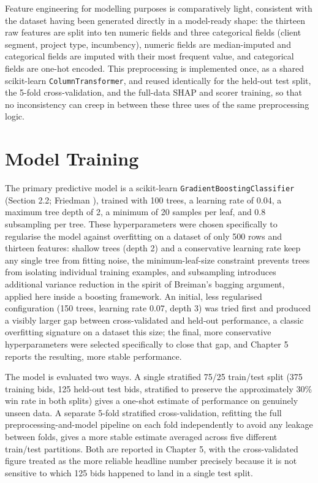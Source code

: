 Feature engineering for modelling purposes is comparatively light,
consistent with the dataset having been generated directly in a
model-ready shape: the thirteen raw features are split into ten numeric
fields and three categorical fields (client segment, project type,
incumbency), numeric fields are median-imputed and categorical fields
are imputed with their most frequent value, and categorical fields are
one-hot encoded. This preprocessing is implemented once, as a shared
scikit-learn \texttt{ColumnTransformer}, and reused identically for the
held-out test split, the 5-fold cross-validation, and the full-data SHAP
and scorer training, so that no inconsistency can creep in between these
three uses of the same preprocessing logic.

\hypertarget{model-training}{%
\section{Model Training}\label{model-training}}

The primary predictive model is a scikit-learn
\texttt{GradientBoostingClassifier} (Section 2.2; Friedman
\citeyearpar{friedman2001greedy}), trained with 100 trees, a learning
rate of 0.04, a maximum tree depth of 2, a minimum of 20 samples per
leaf, and 0.8 subsampling per tree. These hyperparameters were chosen
specifically to regularise the model against overfitting on a dataset of
only 500 rows and thirteen features: shallow trees (depth 2) and a
conservative learning rate keep any single tree from fitting noise, the
minimum-leaf-size constraint prevents trees from isolating individual
training examples, and subsampling introduces additional variance
reduction in the spirit of Breiman's \citeyearpar{breiman2001random}
bagging argument, applied here inside a boosting framework. An initial,
less regularised configuration (150 trees, learning rate 0.07, depth 3)
was tried first and produced a visibly larger gap between
cross-validated and held-out performance, a classic overfitting
signature on a dataset this size; the final, more conservative
hyperparameters were selected specifically to close that gap, and
Chapter 5 reports the resulting, more stable performance.

The model is evaluated two ways. A single stratified 75/25 train/test
split (375 training bids, 125 held-out test bids, stratified to preserve
the approximately 30\% win rate in both splits) gives a one-shot
estimate of performance on genuinely unseen data. A separate 5-fold
stratified cross-validation, refitting the full preprocessing-and-model
pipeline on each fold independently to avoid any leakage between folds,
gives a more stable estimate averaged across five different train/test
partitions. Both are reported in Chapter 5, with the cross-validated
figure treated as the more reliable headline number precisely because it
is not sensitive to which 125 bids happened to land in a single test
split.

